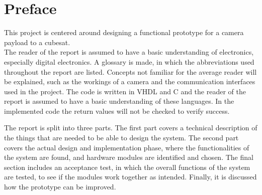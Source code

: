 \chapter*{Preface}\label{ch:forord}%
This project is centered around designing a functional prototype for a camera payload to a cubesat. \\
The reader of the report is assumed to have a basic understanding of electronics, especially digital electronics. A glossary is made, in which the abbreviations used throughout the report are listed. Concepts not familiar for the average reader will be explained, such as the workings of a camera and the communication interfaces used in the project. The code is written in VHDL and C and the reader of the report is assumed to have a basic understanding of these languages. In the implemented code the return values will not be checked to verify success. 

The report is split into three parts. The first part covers a technical description of the things that are needed to be able to design the system. %
The second part covers the actual design and implementation phase, where the functionalities of the system are found, and hardware modules are identified and chosen. %
The final section includes an acceptance test, in which the overall functions of the system are tested, to see if the modules work together as intended.
Finally, it is discussed how the prototype can be improved. %




